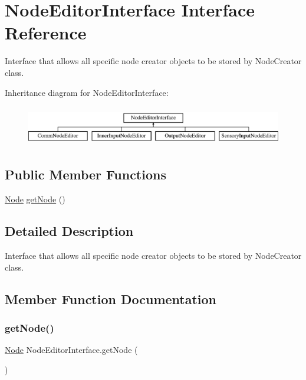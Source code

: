 \hypertarget{interface_node_editor_interface}{}\section{Node\+Editor\+Interface Interface Reference}
\label{interface_node_editor_interface}


Interface that allows all specific node creator objects to be stored by Node\+Creator class.  


Inheritance diagram for Node\+Editor\+Interface\+:\begin{figure}[H]
\begin{center}
\leavevmode
\includegraphics[height=1.783440cm]{interface_node_editor_interface}
\end{center}
\end{figure}
\subsection*{Public Member Functions}
\begin{DoxyCompactItemize}
\item 
\mbox{\hyperlink{class_node}{Node}} \mbox{\hyperlink{interface_node_editor_interface_a56e2abaedf17d7fbf2be90d521ec9363}{get\+Node}} ()
\end{DoxyCompactItemize}


\subsection{Detailed Description}
Interface that allows all specific node creator objects to be stored by Node\+Creator class. 



\subsection{Member Function Documentation}
\mbox{\label{interface_node_editor_interface_a56e2abaedf17d7fbf2be90d521ec9363}} 
\subsubsection{\texorpdfstring{get\+Node()}{getNode()}}
{\footnotesize\ttfamily \mbox{\hyperlink{class_node}{Node}} Node\+Editor\+Interface.\+get\+Node (\begin{DoxyParamCaption}{ }\end{DoxyParamCaption})}



